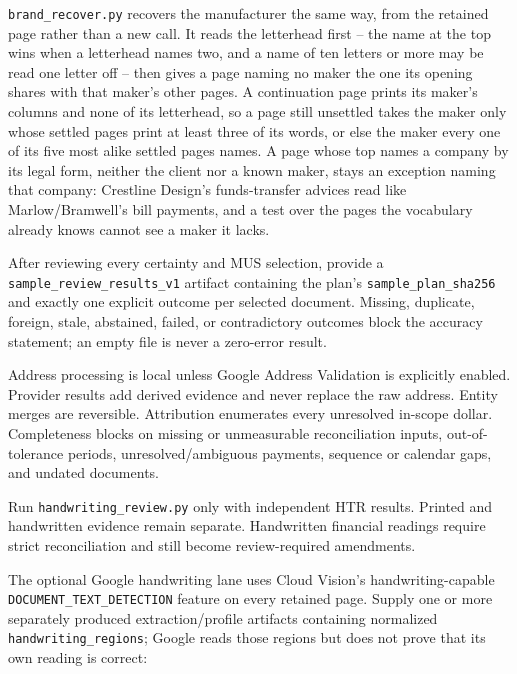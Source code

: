 \documentclass[
]{article}
\newcounter{none} %
\begin{document}
\texttt{brand\_\allowbreak{}recover.py} recovers the manufacturer the
same way, from the retained page rather than a new call. It reads the
letterhead first -- the name at the top wins when a letterhead names
two, and a name of ten letters or more may be read one letter off --
then gives a page naming no maker the one its opening shares with that
maker's other pages. A continuation page prints its maker's columns and
none of its letterhead, so a page still unsettled takes the maker only
whose settled pages print at least three of its words, or else the maker
every one of its five most alike settled pages names. A page whose top
names a company by its legal form, neither the client nor a known maker,
stays an exception naming that company: Crestline Design's
funds-transfer advices read like Marlow/Bramwell's bill payments, and a
test over the pages the vocabulary already knows cannot see a maker it
lacks.

After reviewing every certainty and MUS selection, provide a
\texttt{sample\_\allowbreak{}review\_\allowbreak{}results\_\allowbreak{}v1}
artifact containing the plan's
\texttt{sample\_\allowbreak{}plan\_\allowbreak{}sha256} and exactly one
explicit outcome per selected document. Missing, duplicate, foreign,
stale, abstained, failed, or contradictory outcomes block the accuracy
statement; an empty file is never a zero-error result.

Address processing is local unless Google Address Validation is
explicitly enabled. Provider results add derived evidence and never
replace the raw address. Entity merges are reversible. Attribution
enumerates every unresolved in-scope dollar. Completeness blocks on
missing or unmeasurable reconciliation inputs, out-of-tolerance periods,
unresolved/ambiguous payments, sequence or calendar gaps, and undated
documents.

Run \texttt{handwriting\_\allowbreak{}review.py} only with independent
HTR results. Printed and handwritten evidence remain separate.
Handwritten financial readings require strict reconciliation and still
become review-required amendments.

The optional Google handwriting lane uses Cloud Vision's
handwriting-capable
\texttt{DOCUMENT\_\allowbreak{}TEXT\_\allowbreak{}DETECTION} feature on
every retained page. Supply one or more separately produced
extraction/profile artifacts containing normalized
\texttt{handwriting\_\allowbreak{}regions}; Google reads those regions
but does not prove that its own reading is correct:
\end{document}
